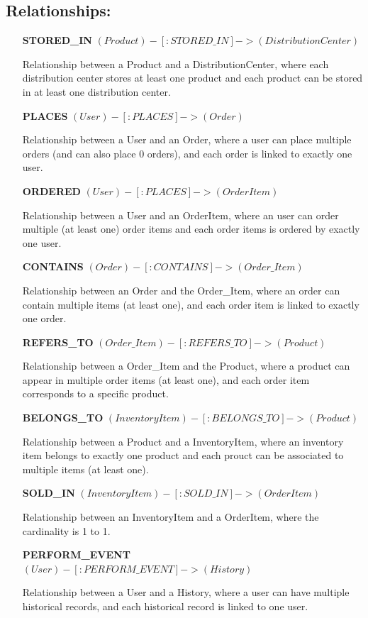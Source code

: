 \documentclass[a4paper,12pt]{article}
\begin{document}
    \subsection{Relationships:}
    \begin{itemize}[noitemsep]

        \item[\textbf{STORED\_IN}] $(Product)-[:STORED\_IN]->(DistributionCenter)$

        Relationship between a Product and a DistributionCenter, where each distribution center stores at least one product and each product can be stored in at least one distribution center.

        \item[\textbf{PLACES}] $(User)-[:PLACES]->(Order)$
        
        Relationship between a User and an Order, where a user can place multiple orders (and can also place 0 orders), and each order is linked to exactly one user.
        
        \item[\textbf{ORDERED}] $(User)-[:PLACES]->(OrderItem)$
        
        Relationship between a User and an OrderItem, where an user can order multiple (at least one) order items and each order items is ordered by exactly one user.

        \item[\textbf{CONTAINS}] $(Order)-[:CONTAINS]->(Order\_Item)$
        
        Relationship between an Order and the Order\_Item, where an order can contain multiple items (at least one), and each order item is linked to exactly one order.
        
        \item[\textbf{REFERS\_TO}] $(Order\_Item)-[:REFERS\_TO]->(Product)$
        
        Relationship between a Order\_Item and the Product, where a product can appear in multiple order items (at least one), and each order item corresponds to a specific product.
        
        \item[\textbf{BELONGS\_TO}] $(InventoryItem)-[:BELONGS\_TO]->(Product)$
        
        Relationship between a Product and a InventoryItem, where an inventory item belongs to exactly one product and each prouct can be associated to multiple items (at least one).

        \item[\textbf{SOLD\_IN}] $(InventoryItem)-[:SOLD\_IN]->(OrderItem)$

        Relationship between an InventoryItem and a OrderItem, where the cardinality is 1 to 1.

        \item[\textbf{PERFORM\_EVENT}] $(User)-[:PERFORM\_EVENT]->(History)$

        Relationship between a User and a History, where a user can have multiple historical records, and each historical record is linked to one user.
        
    \end{itemize}
    
\end{document}
